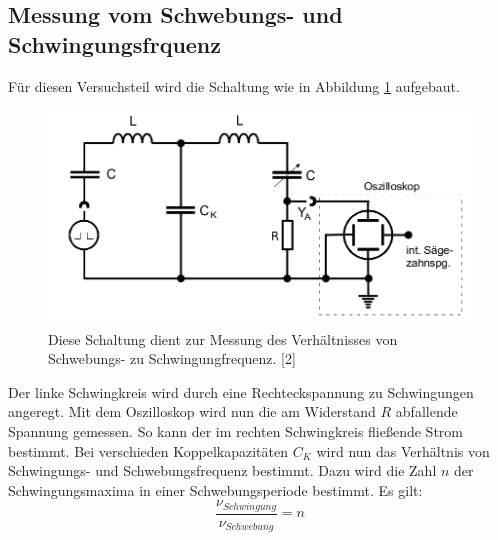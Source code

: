 \documentclass[11pt,ngerman,a4paper]{article}
\begin{document}
\subsection{Messung vom Schwebungs- und Schwingungsfrquenz}
Für diesen Versuchsteil wird die Schaltung wie in Abbildung \ref{abb2} aufgebaut.
\begin{figure}[h!]
\centering
\includegraphics[scale=0.5]{Abb/abb2.png}
\caption{Diese Schaltung dient zur Messung des Verhältnisses von Schwebungs- zu Schwingungfrequenz. [2] }
\label{abb2}
\end{figure}
 Der linke Schwingkreis wird durch eine Rechteckspannung zu Schwingungen angeregt. Mit dem Oszilloskop wird nun die am Widerstand $R$ abfallende Spannung gemessen. So kann der im rechten Schwingkreis fließende Strom bestimmt. Bei verschieden Koppelkapazitäten $C_K$ wird nun das Verhältnis von Schwingungs- und Schwebungsfrequenz bestimmt. Dazu wird die Zahl $n$ der Schwingungsmaxima in einer Schwebungsperiode bestimmt. Es gilt:
\begin{equation}
\frac{\nu_{Schwingung}}{\nu_{Schwebung}} = n
\end{equation}
\end{document}

